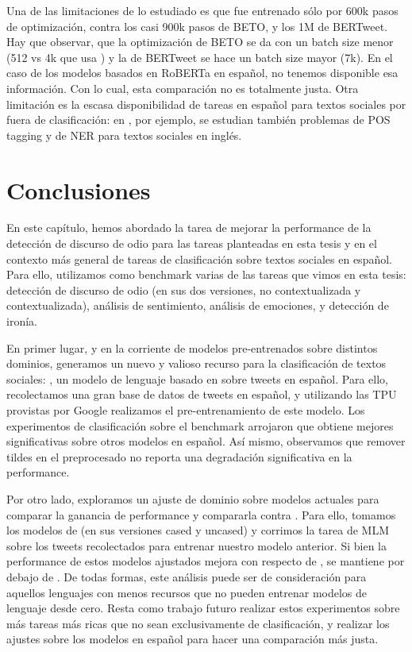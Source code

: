 Una de las limitaciones de lo estudiado es que \robertuito{} fue entrenado sólo por 600k pasos de optimización, contra los casi 900k pasos de BETO, y los 1M de BERTweet. Hay que observar, que la optimización de BETO se da con un batch size menor (512 vs 4k que usa \robertuito{}) y la de BERTweet se hace un batch size mayor (7k). En el caso de los modelos basados en RoBERTa en español, no tenemos disponible esa información. Con lo cual, esta comparación no es totalmente justa. Otra limitación es la escasa disponibilidad de tareas en español para textos sociales por fuera de clasificación: en \citet{bertweet}, por ejemplo, se estudian también problemas de POS tagging y de NER para textos sociales en inglés.

\section{Conclusiones}

En este capítulo, hemos abordado la tarea de mejorar la performance de la detección de discurso de odio para las tareas planteadas en esta tesis y en el contexto más general de tareas de clasificación sobre textos sociales en español. Para ello, utilizamos como benchmark varias de las tareas que vimos en esta tesis: detección de discurso de odio (en sus dos versiones, no contextualizada y contextualizada), análisis de sentimiento, análisis de emociones, y detección de ironía.

En primer lugar, y en la corriente de modelos pre-entrenados sobre distintos dominios, generamos un nuevo y valioso recurso para la clasificación de textos sociales: \robertuito{}, un modelo de lenguaje basado en \roberta{} sobre tweets en español. Para ello, recolectamos una gran base de datos de tweets en español, y utilizando las TPU provistas por Google realizamos el pre-entrenamiento de este modelo. Los experimentos de clasificación sobre el benchmark arrojaron que \robertuito{} obtiene mejores significativas sobre otros modelos en español. Así mismo, observamos que remover tildes en el preprocesado no reporta una degradación significativa en la performance.

Por otro lado, exploramos un ajuste de dominio sobre modelos actuales para comparar la ganancia de performance y compararla contra \robertuito{}. Para ello, tomamos los modelos de \beto{} (en sus versiones cased y uncased) y corrimos la tarea de MLM sobre los tweets recolectados para entrenar nuestro modelo anterior. Si bien la performance de estos modelos ajustados mejora con respecto de \beto{}, se mantiene por debajo de \robertuito{}. De todas formas, este análisis puede ser de consideración para aquellos lenguajes con menos recursos que no pueden entrenar modelos de lenguaje desde cero. Resta como trabajo futuro realizar estos experimentos sobre más tareas más ricas que no sean exclusivamente de clasificación, y realizar los ajustes sobre los modelos \roberta{} en español para hacer una comparación más justa.

